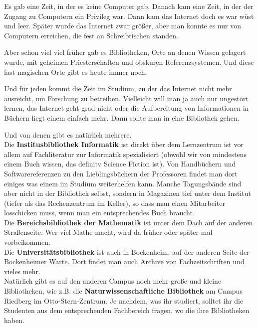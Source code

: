 \spaltenanfang

Es gab eine Zeit, in der es keine Computer gab. Danach kam eine Zeit, in der der Zugang zu Computern ein Privileg war. Dann kam das Internet doch es war w\"ust und leer. Sp\"ater wurde das Internet zwar gr\"o{\ss}er, aber man konnte es nur von Computern erreichen, die fest an Schreibtischen standen.

Aber schon viel viel fr\"uher gab es Bibliotheken, Orte an denen Wissen gelagert wurde, mit geheimen Priesterschaften und obskuren Referenzsystemen. Und diese fast magischen Orte gibt es heute immer noch.

Und f\"ur jeden kommt die Zeit im Studium, zu der das Internet nicht mehr ausreicht, um Forschung zu betreiben. Vielleicht will man ja auch nur ungest\"ort lernen, das Internet geht grad nicht oder die Aufbereitung von Informationen in B\"uchern liegt einem einfach mehr. Dann sollte man in eine Bibliothek gehen.

Und von denen gibt es nat\"urlich mehrere.\\
Die \textbf{Institusbibliothek Informatik} ist direkt \"uber dem Lernzentrum
ist vor allem auf Fachliteratur zur Informatik spezialisiert (obwohl wir von
mindestens einem Buch wissen, das definitv Science Fiction ist). Von Handb\"uchern und
Softwarereferenzen zu den Lieblingsb\"uchern der Professoren findet man dort
einiges was einem im Studium weiterhelfen kann. Manche Tagungsb\"ande sind aber nicht in der Bibliothek selbst,
sondern in Magazinen tief unter dem Institut (tiefer als das Rechenzentrum im Keller), so dass man einen Mitarbeiter losschicken muss, wenn man ein entsprechendes Buch braucht.\\
Die \textbf{Bereichsbibliothek der Mathematik} ist unter dem Dach auf der anderen Stra{\ss}enseite. Wer viel Mathe macht, wird da fr\"uher oder sp\"ater mal vorbeikommen.\\
Die \textbf{Universit\"atsbibliothek} ist auch in Bockenheim, auf der anderen Seite der Bockenheimer Warte. Dort findet man auch Archive von Fachzeitschriften und vieles mehr.\\
Nat\"urlich gibt es auf den anderen Campus noch mehr gro{\ss}e und kleine Bibliotheken, wie z.B. die \textbf{Naturwissenschaftliche Bibliothek} am Campus Riedberg im Otto-Stern-Zentrum. Je nachdem, was ihr studiert, solltet ihr die Studenten aus dem entsprechenden Fachbereich fragen, wo die ihre Bibliotheken haben.

